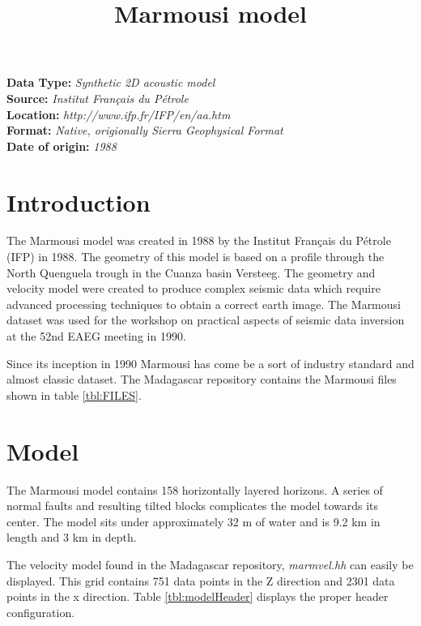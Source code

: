 \title{Marmousi model}
\author{}
\lstset{language=python,numbers=left,numberstyle=\tiny,showstringspaces=false}

\maketitle
\noindent
\textbf {Data Type:} \emph{Synthetic 2D acoustic model}\\
\textbf {Source:} \emph{Institut Fran\c{c}ais du P\'{e}trole}\\
\textbf {Location:} \emph{http://www.ifp.fr/IFP/en/aa.htm}\\
\textbf {Format:} \emph{Native, origionally Sierra Geophysical Format} \\
\textbf{Date of origin:} \emph{1988}\\

\section{Introduction}
The Marmousi model was created in 1988 by the Institut Fran\c{c}ais du P\'{e}trole (IFP) in 1988.  The geometry of this model is based on a profile through the North Quenguela trough in the Cuanza basin Versteeg. The geometry and velocity model were created to produce complex seismic data which require advanced processing techniques to obtain a correct earth image. The Marmousi dataset was used for the workshop on practical aspects of seismic data inversion at the 52nd EAEG meeting in 1990.

Since its inception in 1990 Marmousi has come be a sort of industry standard and almost classic dataset. The Madagascar repository contains the Marmousi files shown in table \ref{tbl:FILES}.

{
\tiny

\normalsize
}

\section{Model}
The Marmousi model contains 158 horizontally layered horizons.  A series of normal faults and resulting tilted blocks complicates the model towards its center.  The model sits under approximately 32 m of water and is 9.2 km in length and 3 km in depth.  

The velocity model found in the Madagascar repository, \emph{marmvel.hh} can easily be displayed.  This grid contains 751 data points in the Z direction and 2301 data points in the x direction.  Table \ref{tbl:modelHeader} displays the proper header configuration.  

